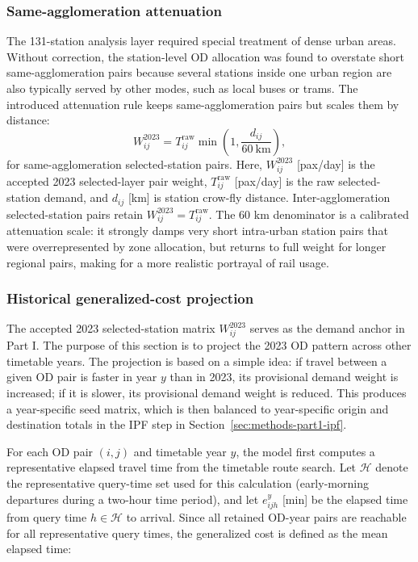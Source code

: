 \documentclass[preprint,12pt]{elsarticle}
\begin{document}
\subsubsection{Same-agglomeration attenuation}\label{sec:methods-part1-agglomeration}
The 131-station analysis layer required special treatment of dense urban areas. Without correction, the station-level OD allocation was found to overstate short same-agglomeration pairs because several stations inside one urban region are also typically served by other modes, such as local buses or trams. The introduced attenuation rule keeps same-agglomeration pairs but scales them by distance:
\begin{equation}
    W^{2023}_{ij}
  =
  T^{\mathrm{raw}}_{ij}
  \min\left(1,\frac{d_{ij}}{60\ \mathrm{km}}\right),
  \label{eq:same-agglomeration-attenuation}
\end{equation}
for same-agglomeration selected-station pairs. Here, $W^{2023}_{ij}$ [pax/day] is the accepted 2023 selected-layer pair weight, $T^{\mathrm{raw}}_{ij}$ [pax/day] is the raw selected-station demand, and $d_{ij}$ [km] is station crow-fly distance. Inter-agglomeration selected-station pairs retain $W^{2023}_{ij}=T^{\mathrm{raw}}_{ij}$. The 60 km denominator is a calibrated attenuation scale: it strongly damps very short intra-urban station pairs that were overrepresented by zone allocation, but returns to full weight for longer regional pairs, making for a more realistic portrayal of rail usage.

\subsubsection{Historical generalized-cost projection}\label{sec:methods-part1-gc}

The accepted 2023 selected-station matrix $W^{2023}_{ij}$ serves as the demand anchor in Part I. The purpose of this section is to project the 2023 OD pattern across other timetable years. The projection is based on a simple idea: if travel between a given OD pair is faster in year $y$ than in 2023, its provisional demand weight is increased; if it is slower, its provisional demand weight is reduced. This produces a year-specific seed matrix, which is then balanced to year-specific origin and destination totals in the IPF step in Section~\ref{sec:methods-part1-ipf}.

For each OD pair $(i,j)$ and timetable year $y$, the model first computes a representative elapsed travel time from the timetable route search. Let $\mathcal{H}$ denote the representative query-time set used for this calculation (early-morning departures during a two-hour time period), and let $e^y_{ijh}$ [min] be the elapsed time from query time $h\in\mathcal{H}$ to arrival. Since all retained OD-year pairs are reachable for all representative query times, the generalized cost is defined as the mean elapsed time:
\end{document}

